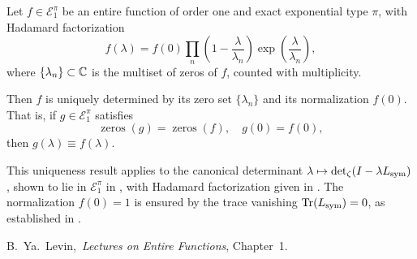 \begin{lemma}
\label{lem:hadamard_uniqueness_E1pi}
Let \( f \in \mathcal{E}_1^\pi \) be an entire function of order one and exact exponential type \( \pi \), with Hadamard factorization
\[
f(\lambda) = f(0) \prod_n \left( 1 - \frac{\lambda}{\lambda_n} \right) \exp\left( \frac{\lambda}{\lambda_n} \right),
\]
where \( \{ \lambda_n \} \subset \mathbb{C} \) is the multiset of zeros of \( f \), counted with multiplicity.

Then \( f \) is uniquely determined by its zero set \( \{ \lambda_n \} \) and its normalization \( f(0) \). That is, if \( g \in \mathcal{E}_1^\pi \) satisfies
\[
\operatorname{zeros}(g) = \operatorname{zeros}(f), \quad g(0) = f(0),
\]
then \( g(\lambda) \equiv f(\lambda) \).

\medskip
\noindent
This uniqueness result applies to the canonical determinant \( \lambda \mapsto \det\nolimits_{\zeta}(I - \lambda L_{\mathrm{sym}}) \), shown to lie in \( \mathcal{E}_1^\pi \) in , with Hadamard factorization given in . The normalization \( f(0) = 1 \) is ensured by the trace vanishing \( \operatorname{Tr}(L_{\mathrm{sym}}) = 0 \), as established in .

\begin{references}
  \item B.~Ya.~Levin,\ \emph{Lectures on Entire Functions}, Chapter~1\cite{Levin1996EntireLectures}.
\end{references}
\end{lemma}
